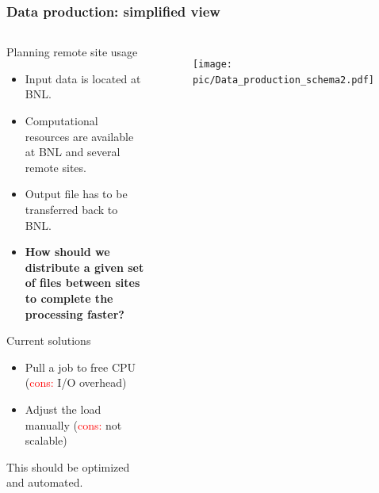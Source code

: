 \documentclass{beamer}
\begin{document}
\begin{frame}\frametitle{Data production: simplified view }
 	\begin{columns}[c] %
    \begin{footnotesize}
    \vspace{-11mm}
	\begin{block}{Planning remote site usage}
		\begin{itemize}
		\item Input data is located at BNL.
		\item Computational resources are available at BNL and several remote sites.
		\item Output file has to be transferred back to BNL.
		\item \textbf{How should we distribute a given set of files between sites to complete the processing faster?}
		\end{itemize}
 	\end{block} 	
 	
 	\begin{block}{Current solutions} 	
		\begin{itemize}
		  \item Pull a job to free CPU (\textcolor{red}{cons:} I/O overhead)
		  \item Adjust the load manually (\textcolor{red}{cons:} not scalable)
		\end{itemize}
	This should be optimized and automated.
 	\end{block}  	     

 	\end{footnotesize}
 		\vspace{-5mm}
		\begin{figure}   
				\texttt{[image: pic/Data\_production\_schema2.pdf]}
		\end{figure} 	 	
 	\end{columns}
\end{frame}
\end{document}
